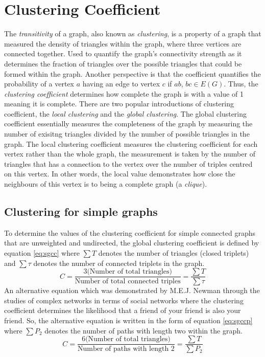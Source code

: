 \section{Clustering Coefficient}
The \emph{transitivity} \cite{schank2005approximating} of a graph, also known as \emph{clustering}, is a property of a graph that measured the density of triangles within the graph, where three vertices are connected together. Used to quantify the graph's connectivity strength as it determines the fraction of triangles over the possible triangles that could be formed within the graph. Another perspective is that the coefficient quantifies the probability of a vertex $a$ having an edge to vertex $c$ if $ab$, $bc \in E(G)$. Thus, the \emph{clustering coefficient} determines how complete the graph is with a value of 1 meaning it is complete. There are two popular introductions of clustering coefficient, the \emph{local clustering} and the \emph{global clustering}. The global clustering coefficient essentially measures the completeness of the graph by measuring the number of exisitng triangles divided by the number of possible triangles in the graph. The local clustering coefficient measures the clustering coefficient for each vertex rather than the whole graph, the measurement is taken by the number of triangles that has a connection to the vertex over the number of triples centred on this vertex. In other words, the local value demonstrates how close the neighbours of this vertex is to being a complete graph (a \emph{clique}).

\subsection{Clustering for simple graphs}
To determine the values of the clustering coefficient for simple connected graphs that are unweighted and undirected, the global clustering coefficient is defined by equation \ref{eq:sgcc} where $\sum{T}$ denotes the number of triangles (closed triplets) and $\sum{\tau}$ denotes the number of connected triplets in the graph.
\begin{equation} \label{eq:sgcc}
C = \frac{3\text{(Number of total triangles)}}{\text{Number of total connected triples}} = \frac{\sum{T}}{\sum{\tau}}
\end{equation}
An alternative equation which was demonstrated by M.E.J. Newman \cite{Newman_2003} through the studies of complex networks in terms of social networks where the clustering coefficient determines the likelihood that a friend of your friend is also your friend. So, the alternative equation is written in the form of equation \ref{eq:sgccp} where $\sum{P_2}$ denotes the number of paths with length two within the graph.
\begin{equation} \label{eq:sgccp}
C = \frac{6\text{(Number of total triangles)}}{\text{Number of paths with length 2}} = \frac{\sum{T}}{\sum{P_2}}
\end{equation}

